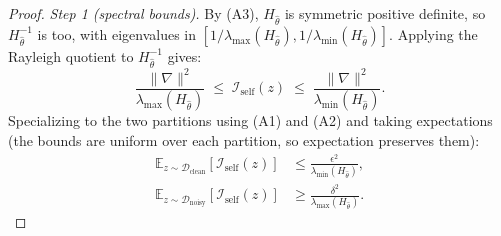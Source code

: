 \documentclass[12pt, a4paper, twoside]{book}
\numberwithin{equation}{chapter}
\theoremstyle{plain}
\theoremstyle{definition}
\theoremstyle{remark}
\newenvironment{foldable}{}{}
\begin{document}
\begin{foldable}
\begin{proof}
        \textit{Step 1 (spectral bounds).}
        By (A3), $H_{\hat\theta}$ is symmetric positive definite, so $H_{\hat\theta}^{-1}$ is too, with eigenvalues in $[1/\lambda_{\max}(H_{\hat\theta}), 1/\lambda_{\min}(H_{\hat\theta})]$.
        Applying the Rayleigh quotient to $H_{\hat\theta}^{-1}$ gives:
        \begin{equation}
            \frac{\|\nabla\|^2}{\lambda_{\max}(H_{\hat\theta})}
            \;\leq\; \mathcal{I}_\text{self}(z)
            \;\leq\; \frac{\|\nabla\|^2}{\lambda_{\min}(H_{\hat\theta})}.
        \end{equation}
        Specializing to the two partitions using (A1) and (A2) and taking expectations (the bounds are uniform over each partition, so expectation preserves them):
        \begin{align}
            \mathbb{E}_{z \sim \mathcal{D}_\text{clean}}[\mathcal{I}_\text{self}(z)]
            &\leq \frac{\epsilon^2}{\lambda_{\min}(H_{\hat\theta})}, \\
            \mathbb{E}_{z \sim \mathcal{D}_\text{noisy}}[\mathcal{I}_\text{self}(z)]
            &\geq \frac{\delta^2}{\lambda_{\max}(H_{\hat\theta})}.
        \end{align}


\end{proof}
\end{foldable}
\end{document}
